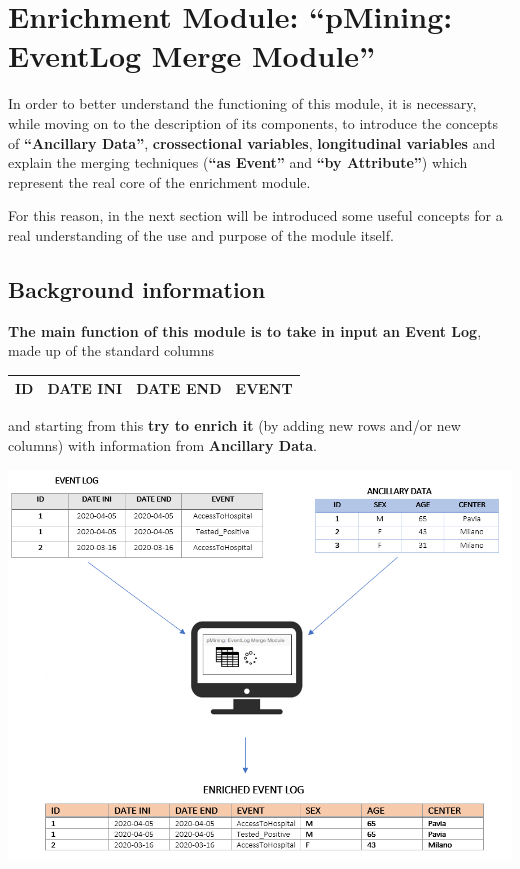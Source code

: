 \documentclass[
]{book}
\begin{document}
\hypertarget{enrichment-module-pmining-eventlog-merge-module}{%
\chapter{Enrichment Module: ``pMining: EventLog Merge Module''}\label{enrichment-module-pmining-eventlog-merge-module}}

In order to better understand the functioning of this module, it is necessary, while moving on to the description of its components, to introduce the concepts of \textbf{``Ancillary Data''}, \textbf{crossectional variables}, \textbf{longitudinal variables} and explain the merging techniques (\textbf{``as Event''} and \textbf{``by Attribute''}) which represent the real core of the enrichment module.

For this reason, in the next section will be introduced some useful concepts for a real understanding of the use and purpose of the module itself.

\hypertarget{background-information}{%
\section{Background information}\label{background-information}}

\textbf{The main function of this module is to take in input an Event Log}, made up of the standard columns

\begin{longtable}[]{@{}llll@{}}
\toprule
ID & DATE INI & DATE END & EVENT \\
\midrule
\endhead
\bottomrule
\end{longtable}

and starting from this \textbf{try to enrich it} (by adding new rows and/or new columns) with information from \textbf{Ancillary Data}.

\includegraphics[width=1\textwidth,height=\textheight]{images/MERGEMODULEdescr.png}
\end{document}
